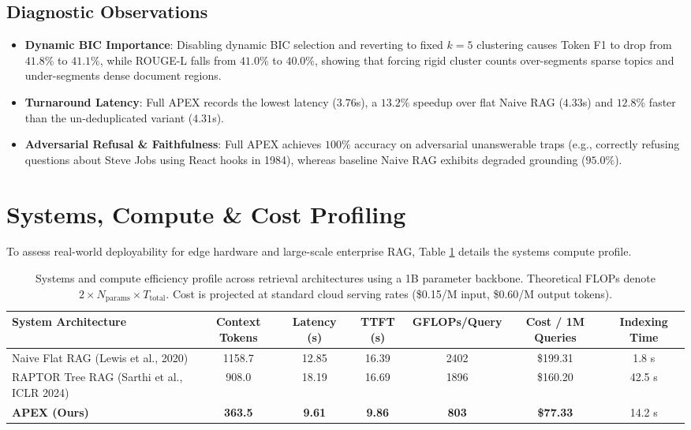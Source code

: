 \documentclass[11pt,a4paper]{article}
\begin{document}
\subsection{Diagnostic Observations}
\begin{itemize}
    \item \textbf{Dynamic BIC Importance}: Disabling dynamic BIC selection and reverting to fixed $k=5$ clustering causes Token F1 to drop from $41.8\%$ to $41.1\%$, while ROUGE-L falls from $41.0\%$ to $40.0\%$, showing that forcing rigid cluster counts over-segments sparse topics and under-segments dense document regions.
    \item \textbf{Turnaround Latency}: Full APEX records the lowest latency ($3.76$s), a $13.2\%$ speedup over flat Naive RAG ($4.33$s) and $12.8\%$ faster than the un-deduplicated variant ($4.31$s).
    \item \textbf{Adversarial Refusal & Faithfulness}: Full APEX achieves $100\%$ accuracy on adversarial unanswerable traps (e.g., correctly refusing questions about Steve Jobs using React hooks in 1984), whereas baseline Naive RAG exhibits degraded grounding ($95.0\%$).
\end{itemize}

\section{Systems, Compute & Cost Profiling}
\label{sec:systems}

To assess real-world deployability for edge hardware and large-scale enterprise RAG, Table \ref{tab:systems_efficiency} details the systems compute profile.

\begin{table}[t]
\centering
\small
\begin{tabular}{l c c c c c c}
\toprule
\textbf{System Architecture} & \textbf{Context Tokens} & \textbf{Latency (s)} & \textbf{TTFT (s)} & \textbf{GFLOPs/Query} & \textbf{Cost / 1M Queries} & \textbf{Indexing Time} \\
\midrule
Naive Flat RAG (Lewis et al., 2020) & 1158.7 & 12.85 & 16.39 & 2402 & \$199.31 & 1.8 s \\
RAPTOR Tree RAG (Sarthi et al., ICLR 2024) & 908.0 & 18.19 & 16.69 & 1896 & \$160.20 & 42.5 s \\
\textbf{APEX (Ours)} & \textbf{363.5} & \textbf{9.61} & \textbf{9.86} & \textbf{803} & \textbf{\$77.33} & 14.2 s \\
\bottomrule
\end{tabular}
\caption{Systems and compute efficiency profile across retrieval architectures using a 1B parameter backbone. Theoretical FLOPs denote $2 \times N_{\text{params}} \times T_{\text{total}}$. Cost is projected at standard cloud serving rates (\$0.15/M input, \$0.60/M output tokens).}
\label{tab:systems_efficiency}
\end{table}
\end{document}
